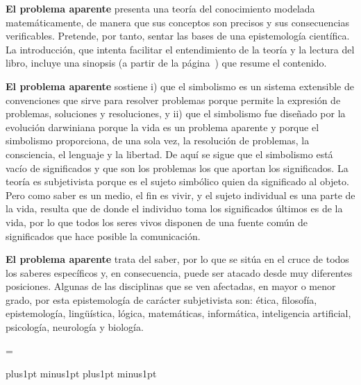 \null
{\bf El problema aparente} presenta una teoría del conocimiento modelada
matemáticamente, de manera que sus conceptos son precisos y sus
consecuencias verificables. Pretende, por tanto, sentar las bases de una
epistemología científica. La introducción, que intenta facilitar el
entendimiento de la teoría y la lectura del libro, incluye una sinopsis (a
partir de la página~{}) que resume el contenido.

\null
{\bf El problema aparente} sostiene i) que el simbolismo es un sistema
extensible de convenciones que sirve para resolver problemas porque permite
la expresión de problemas, soluciones y resoluciones, y ii) que el
simbolismo fue diseñado por la evolución darwiniana porque la vida es un
problema aparente y porque el simbolismo proporciona, de una sola vez, la
resolución de problemas, la consciencia, el lenguaje y la libertad. De aquí
se sigue que el simbolismo está vacío de significados y que son los
problemas los que aportan los significados. La teoría es subjetivista porque
es el sujeto simbólico quien da significado al objeto. Pero como saber es un
medio, el fin es vivir, y el sujeto individual es una parte de la vida,
resulta que de donde el individuo toma los significados últimos es de la
vida, por lo que todos los seres vivos disponen de una fuente común de
significados que hace posible la comunicación.

\null
{\bf El problema aparente} trata del saber, por lo que se sitúa en el cruce
de todos los saberes específicos y, en consecuencia, puede ser atacado desde
muy diferentes posiciones. Algunas de las disciplinas que se ven afectadas,
en mayor o menor grado, por esta epistemología de carácter subjetivista son:
 ética, filosofía, epistemología,
 lingüística, lógica, matemáticas,
 informática, inteligencia artificial,
 psicología, neurología y biología.

\break %

\ifcase\pdfoutput
 \else
 \background {}\fi



\null
\vsize=\vpage \advance\vsize-72bp
\baselineskip

\ptextfont
\parindent=0pt
\parskip=0pt plus1pt minus1pt
\baselineskip=13.3pt plus1pt minus1pt %

